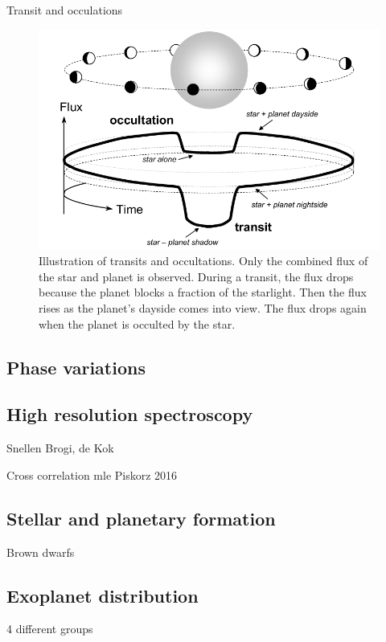 Transit and occulations~\citet{winn_transits_2010}


\begin{figure}
    \centering
    \includegraphics[width=0.6\linewidth]{./figures/introduction/circular_diagram.png}
    \caption{Illustration of transits and occultations. Only the combined flux of the star and planet is observed. During a transit, the flux
        drops because the planet blocks a fraction of the starlight. Then the flux rises as the planet’s dayside comes into view. The flux drops
        again when the planet is occulted by the star.~\citet{winn_transits_2010}}
    \label{fig:transits_and_occultations}
\end{figure}

\subsection{Phase variations}

\subsection{High resolution spectroscopy}
Snellen  Brogi, de Kok

Cross correlation mle  Piskorz 2016


\subsection{Stellar and planetary formation}

Brown dwarfs

\subsection{Exoplanet distribution} 4 different groups

\fref{}


